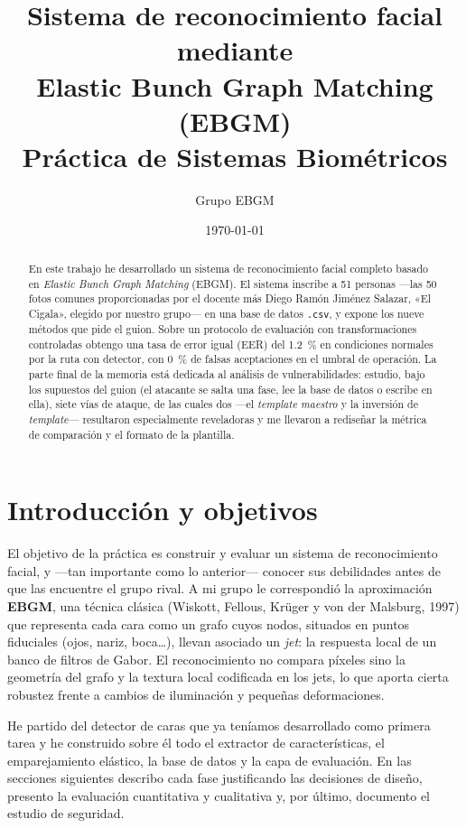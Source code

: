 \documentclass[11pt,a4paper]{article}
\title{\textbf{Sistema de reconocimiento facial mediante\\ Elastic Bunch Graph Matching (EBGM)}\\[4pt]
\large Práctica de Sistemas Biométricos}
\author{Grupo EBGM}
\date{\today}
\begin{document}
\maketitle

\begin{abstract}
\noindent En este trabajo he desarrollado un sistema de reconocimiento facial completo
basado en \emph{Elastic Bunch Graph Matching} (EBGM). El sistema inscribe a 51 personas
---las 50 fotos comunes proporcionadas por el docente más Diego Ramón Jiménez Salazar,
«El Cigala», elegido por nuestro grupo--- en una base de datos \texttt{.csv}, y expone los
nueve métodos que pide el guion. Sobre un protocolo de evaluación con transformaciones
controladas obtengo una tasa de error igual (EER) del \SI{1.2}{\percent} en condiciones
normales por la ruta con detector, con \SI{0}{\percent} de falsas aceptaciones en el umbral
de operación. La parte final de la memoria está dedicada al análisis de vulnerabilidades:
estudio, bajo los supuestos del guion (el atacante se salta una fase, lee la base de datos o
escribe en ella), siete vías de ataque, de las cuales dos ---el \emph{template maestro} y la
inversión de \emph{template}--- resultaron especialmente reveladoras y me llevaron a rediseñar
la métrica de comparación y el formato de la plantilla.
\end{abstract}

\section{Introducción y objetivos}

El objetivo de la práctica es construir y evaluar un sistema de reconocimiento facial, y
---tan importante como lo anterior--- conocer sus debilidades antes de que las encuentre el
grupo rival. A mi grupo le correspondió la aproximación \textbf{EBGM}, una técnica clásica
(Wiskott, Fellous, Krüger y von der Malsburg, 1997) que representa cada cara como un grafo
cuyos nodos, situados en puntos fiduciales (ojos, nariz, boca\ldots), llevan asociado un
\emph{jet}: la respuesta local de un banco de filtros de Gabor. El reconocimiento no compara
píxeles sino la geometría del grafo y la textura local codificada en los jets, lo que aporta
cierta robustez frente a cambios de iluminación y pequeñas deformaciones.

He partido del detector de caras que ya teníamos desarrollado como primera tarea
y he construido sobre él todo el extractor de características, el emparejamiento elástico, la
base de datos y la capa de evaluación. En las secciones siguientes describo cada fase
justificando las decisiones de diseño, presento la evaluación cuantitativa y cualitativa y,
por último, documento el estudio de seguridad.
\end{document}
